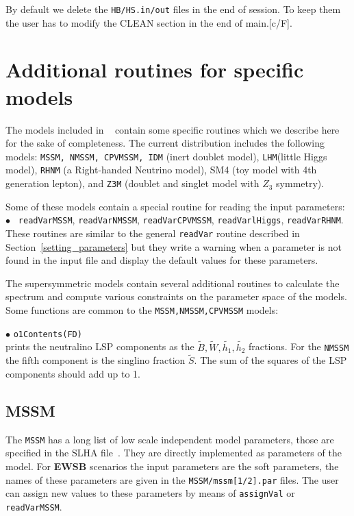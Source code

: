 \documentclass[12pt,a4paper]{article}
\begin{document}
By default we delete the \verb|HB/HS.in/out|  files in the end of session. 
To keep them the user has to modify the CLEAN section in the end of main.[c/F].




\section{Additional routines for specific models}
The models included in \micro~ contain some specific routines
which we describe here for the sake of completeness. The current 
distribution includes the following models: {\tt MSSM, NMSSM, CPVMSSM, IDM}  (inert doublet model), {\tt LHM}(little Higgs model),
{\tt RHNM} (a Right-handed Neutrino model), SM4 (toy model with 4th generation lepton), and {\tt Z3M} (doublet and singlet model with $Z_3$ symmetry). 

Some of these models contain a special routine for reading the input parameters:\\
$\bullet$ \verb| readVarMSSM|, \verb|readVarNMSSM|,  \verb|readVarCPVMSSM|,
\verb|readVarlHiggs|, \verb|readVarRHNM|.\\
 These routines  are similar to the general 
\verb|readVar| routine described  in Section~\ref{setting_parameters}
but  they write a warning when a parameter is not found in the 
input file and display the default values for these parameters.

The supersymmetric models contain several additional routines to calculate the spectrum
and compute various constraints on the parameter space of the models. Some functions are
common to the \verb|MSSM,NMSSM,CPVMSSM| models: 


\noindent
$\bullet$  \verb|o1Contents(FD)|\\
prints  the neutralino LSP components as the  $\tilde{B},\tilde{W},
\tilde{h_1},\tilde{h_2}$ fractions. For the {\tt NMSSM} the fifth component is
the singlino fraction  $\tilde{S}$. The sum of the squares of the LSP components
should add up to 1. 



\subsection{MSSM}
The {\tt MSSM} has a long list of low scale  independent model 
parameters, those are specified in the SLHA file~\cite{Skands:2003cj,Allanach:2008qq}.
They are directly implemented as parameters of the model.
For {\bf EWSB} scenarios the input parameters are  the soft parameters, the names 
of these parameters are given in the {\tt MSSM/mssm[1/2].par} files.
The user  can assign new values to these parameters by means of {\tt assignVal}
or {\tt readVarMSSM}.
\end{document}
